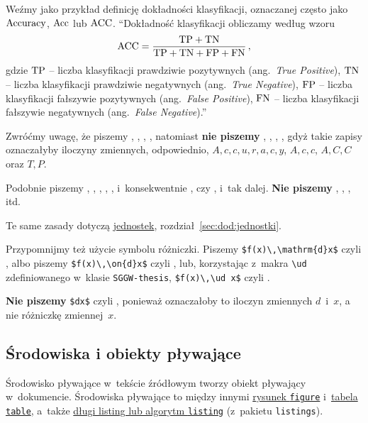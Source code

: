 Weźmy jako przykład definicję dokładności klasyfikacji, oznaczanej często jako ${\operatorname{{Accuracy}}}$, ${\operatorname{{Acc}}}$ lub ${\operatorname{{ACC}}}$. ``Dokładność klasyfikacji obliczamy według wzoru
\begin{equation}\label{eqn:acc}
  {\ensuremath{\operatorname{{ACC}}}} = \frac{{\operatorname{{TP}}}+{\operatorname{{TN}}}}{{\operatorname{{TP}}}+{\operatorname{{TN}}}+{\operatorname{{FP}}}+{\operatorname{{FN}}}} \, ,
\end{equation}
gdzie 
${\operatorname{{TP}}}$ -- liczba klasyfikacji prawdziwie pozytywnych (ang.\ {\em True Positive}), 
${\operatorname{{TN}}}$ -- liczba klasyfikacji prawdziwie negatywnych (ang.\ {\em True Negative}), 
${\operatorname{{FP}}}$ -- liczba klasyfikacji fałszywie pozytywnych (ang.\ {\em False Positive}), 
${\operatorname{{FN}}}$ -- liczba klasyfikacji fałszywie negatywnych (ang.\ {\em False Negative}).''

Zwróćmy uwagę, że piszemy , , , , natomiast {\bf nie piszemy} , , , , gdyż takie zapisy oznaczałyby iloczyny zmiennych, odpowiednio, $A, c, c, u, r, a, c, y$, $A, c, c$, $A, C, C$ oraz $T, P$.

Podobnie piszemy \posit{$\sin$}, \posit{$\ln$}, , , , i~konsekwentnie ,  czy , i~tak dalej. {\bf Nie piszemy} , , , itd.

Te same zasady dotyczą \hyperref[sec:dod:jednostki]{jednostek}, rozdział~\ref{sec:dod:jednostki}.

Przypomnijmy też użycie symbolu różniczki. Piszemy \verb+$f(x)\,\mathrm{d}x$+ czyli , albo piszemy \verb+$f(x)\,\on{d}x$+ czyli , lub, korzystając z~makra \verb+\ud+ zdefiniowanego w~klasie {\tt SGGW-thesis}, \verb+$f(x)\,\ud x$+ czyli . 

{\bf Nie piszemy} \verb+$dx$+ czyli , ponieważ oznaczałoby to iloczyn zmiennych $d$~i~$x$, a nie różniczkę zmiennej~$x$.

\subsection{Środowiska i obiekty pływające}
\label{sec:dod:plywajace}

Środowisko pływające w~tekście źródłowym tworzy obiekt pływający w~dokumencie. Środowiska pływające to między innymi \hyperref[sec:dod:rysunek]{rysunek {\tt figure}} i~\hyperref[sec:dod:tabela]{tabela {\tt table}}, a~także \hyperref[sec:dod:listing-dlugi]{długi listing lub algorytm {\tt listing}} (z~pakietu {\tt listings}).

